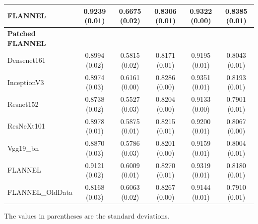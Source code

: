 \documentclass{sigkddExp}
\begin{document}
\begin{table}
\begin{tabular}{ |lccccc| }
        FLANNEL                   & 0.9239 (0.01) & 0.6675 (0.02)   & 0.8306 (0.01)      &
        0.9322 (0.00)             & 0.8385 (0.01)                                          \\ \hline
        \textbf{Patched FLANNEL}  &               &                 &                    &
                                  &                                                        \\
        Densenet161               & 0.8994 (0.02) & 0.5815 (0.02)   & 0.8171 (0.01)      &
        0.9195 (0.01)             & 0.8043 (0.01)                                          \\
        InceptionV3               & 0.8974 (0.03) & 0.6161 (0.00)   & 0.8286 (0.00)      &
        0.9351 (0.01)             & 0.8193 (0.01)                                          \\
        Resnet152                 & 0.8738 (0.02) & 0.5527 (0.03)   & 0.8204 (0.00)      &
        0.9133 (0.00)             & 0.7901 (0.01)                                          \\
        ResNeXt101                & 0.8978 (0.01) & 0.5875 (0.01)   & 0.8215 (0.01)      &
        0.9200 (0.01)             & 0.8067 (0.00)                                          \\
        Vgg19\_bn                 & 0.8870 (0.03) & 0.5786 (0.03)   & 0.8201 (0.00)      &
        0.9159 (0.01)             & 0.8004 (0.01)                                          \\

        FLANNEL                   & 0.9121 (0.02) & 0.6009 (0.01)   & 0.8270 (0.01)      &
        0.9319 (0.01)             & 0.8180 (0.01)                                          \\ \hline
        FLANNEL\_OldData          & 0.8168 (0.03) & 0.6063 (0.02)   & 0.8267 (0.00)      &
        0.9144 (0.01)             & 0.7910 (0.01)                                          \\ \hline
    \end{tabular}\par
    \bigskip
    The values in parentheses are the standard deviations.
\end{table}
\end{document}
